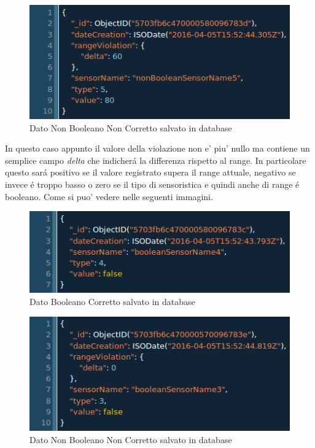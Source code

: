 \begin{figure}[ht]
\centering
\includegraphics[scale=0.5,natwidth=610,natheight=642]{Figures/DataStructures/DataViolation.png}
\caption{Dato Non Booleano Non Corretto salvato in database}
\end{figure}

In questo caso appunto il valore della violazione non e' piu' nullo ma contiene un semplice campo \textit{delta} che indicher\'a la differenza rispetto al range. In particolare questo sar\'a positivo se il valore registrato supera il range attuale, negativo se invece \'e troppo basso o zero se il tipo di sensoristica e quindi anche di range \'e booleano. Come si puo' vedere nelle seguenti immagini.

\begin{figure}[ht]
\centering
\includegraphics[scale=0.5,natwidth=610,natheight=642]{Figures/DataStructures/BooleanDataNoViolation.png}
\caption{Dato Booleano Corretto salvato in database}
\end{figure}

\begin{figure}[ht]
\centering
\includegraphics[scale=0.5,natwidth=610,natheight=642]{Figures/DataStructures/BooleanDataViolation.png}
\caption{Dato Non Booleano Non Corretto salvato in database}
\end{figure}

